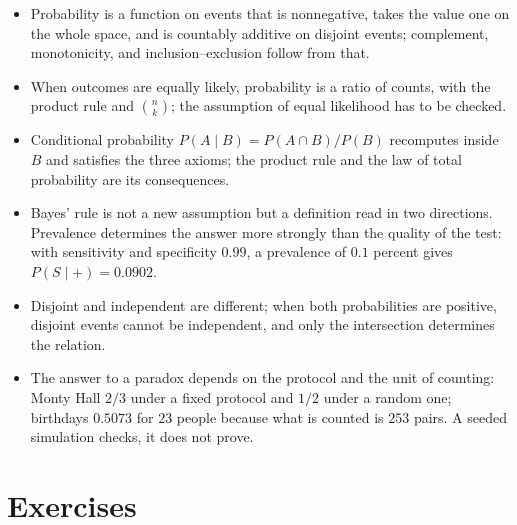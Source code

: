 \begin{ringkasan}
\begin{itemize}
  \item Probability is a function on events that is nonnegative, takes the value one on the
        whole space, and is countably additive on disjoint events; complement,
        monotonicity, and inclusion--exclusion follow from that.
  \item When outcomes are equally likely, probability is a ratio of counts, with the product
        rule and $\binom{n}{k}$; the assumption of equal likelihood has to be checked.
  \item Conditional probability $P(A\mid B)=P(A\cap B)/P(B)$ recomputes inside $B$
        and satisfies the three axioms; the product rule and the law of total probability
        are its consequences.
  \item Bayes' rule is not a new assumption but a definition read in two directions.
        Prevalence determines the answer more strongly than the quality of the test: with
        sensitivity and specificity $0.99$, a prevalence of $0.1$ percent gives
        $P(S\mid+)=0.0902$.
  \item Disjoint and independent are different; when both probabilities are positive,
        disjoint events cannot be independent, and only the intersection determines the
        relation.
  \item The answer to a paradox depends on the protocol and the unit of counting: Monty Hall
        $2/3$ under a fixed protocol and $1/2$ under a random one; birthdays $0.5073$ for
        $23$ people because what is counted is $253$ pairs. A seeded simulation
        checks, it does not prove.
\end{itemize}
\end{ringkasan}

\section{Exercises}

